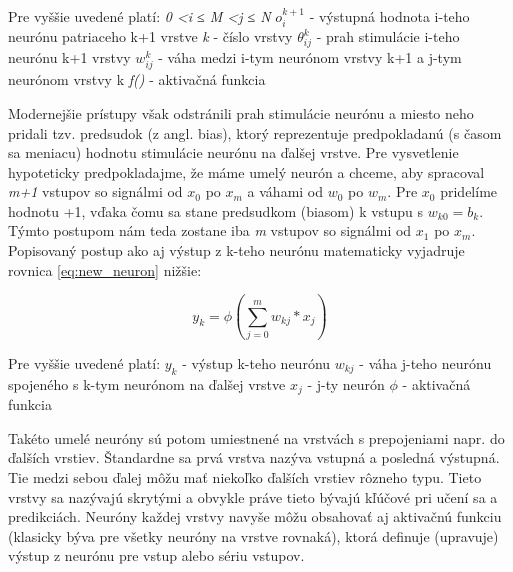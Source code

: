 Pre vyššie uvedené platí: 
\newline
\textit{0 \textless i ≤ M
 \textless j ≤ N}
\newline
\(o_i^{k+1}\)  - výstupná hodnota i-teho neurónu patriaceho k+1 vrstve 
\newline
\textit{k} - číslo vrstvy
\newline
\(\theta_{ij}^{k}\) - prah stimulácie i-teho neurónu k+1 vrstvy
\newline
\(w_{ij}^{k}\) - váha medzi i-tym neurónom vrstvy k+1 a j-tym neurónom vrstvy k 
\newline 
\textit{f()} - aktivačná funkcia
\newline
	
Modernejšie prístupy však odstránili prah stimulácie neurónu a miesto neho pridali tzv. predsudok (z angl. bias), ktorý reprezentuje predpokladanú (s časom sa meniacu) hodnotu stimulácie neurónu na ďalšej vrstve. Pre vysvetlenie hypoteticky predpokladajme, že máme umelý neurón a chceme, aby spracoval \textit{m+1} vstupov so signálmi od \(x_0\) po \(x_m\) a váhami od \(w_0\) po \(w_m\). Pre \(x_0\) pridelíme hodnotu +1, vďaka čomu sa stane predsudkom (biasom) k vstupu s \(w_{k0} = b_k\). Týmto postupom nám teda zostane iba \textit{m} vstupov so signálmi od \(x_1\) po \(x_m\). Popisovaný postup ako aj výstup z k-teho neurónu matematicky vyjadruje rovnica \ref{eq:new_neuron} nižšie:

	\begin{equation}
		\label{eq:new_neuron}
		y_k = \phi (\sum_{j=0}^{m} w_{kj}*x_j)
	\end{equation}
	
Pre vyššie uvedené platí:
\newline
\(y_k\) - výstup k-teho neurónu
\newline
\(w_{kj}\) - váha j-teho neurónu spojeného s k-tym neurónom na ďalšej vrstve
\newline
\(x_j\) - j-ty neurón 
\newline
\(\phi\) - aktivačná funkcia
\newline

Takéto umelé neuróny sú potom umiestnené na vrstvách s prepojeniami napr. do ďalších vrstiev. Štandardne sa prvá vrstva nazýva vstupná a posledná výstupná. Tie medzi sebou ďalej môžu mať niekoľko ďalších vrstiev rôzneho typu. Tieto vrstvy sa nazývajú skrytými a obvykle práve tieto bývajú kľúčové pri učení sa a predikciách. Neuróny každej vrstvy navyše môžu obsahovať aj aktivačnú funkciu (klasicky býva pre všetky neuróny na vrstve rovnaká), ktorá definuje (upravuje) výstup z neurónu pre vstup alebo sériu vstupov.
	
